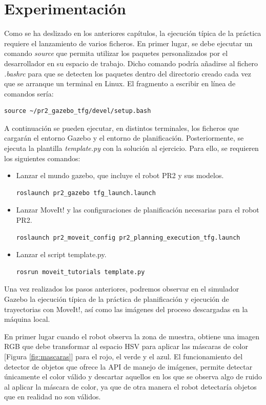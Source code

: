 \documentclass[12pt,spanish,chapterprefix, numbers=noenddot]{book}
\numberwithin{equation}{section}
\numberwithin{figure}{section}
\begin{document}
\section{Experimentación}
Como se ha deslizado en los anteriores capítulos, la ejecución típica \cite{tfg_video_1} \cite{tfg_video_2} de la práctica requiere el lanzamiento de varios ficheros. En primer lugar, se debe ejecutar un comando \textit{source} que permita utilizar los paquetes personalizados por el desarrollador en su espacio de trabajo. Dicho comando podría añadirse al fichero \textit{.bashrc} para que se detecten los paquetes dentro del directorio creado cada vez que se arranque un terminal en Linux. El fragmento a escribir en línea de comandos sería: 
	\begin{lstlisting}[frame=single]
source ~/pr2_gazebo_tfg/devel/setup.bash
    \end{lstlisting}
    
A continuación se pueden ejecutar, en distintos terminales, los ficheros que cargarán el entorno Gazebo y el entorno de planificación. Posteriormente, se ejecuta la plantilla \textit{template.py} con la solución al ejercicio. Para ello, se requieren los siguientes comandos: 
\begin{itemize}
    \item Lanzar el mundo gazebo, que incluye el robot PR2 y sus modelos.
	\begin{lstlisting}[frame=single]
roslaunch pr2_gazebo tfg_launch.launch
    \end{lstlisting}
    \item Lanzar MoveIt! y las configuraciones de planificación necesarias para el robot PR2.
	\begin{lstlisting}[frame=single]
roslaunch pr2_moveit_config pr2_planning_execution_tfg.launch
    \end{lstlisting}
    \item Lanzar el script template.py.
	\begin{lstlisting}[frame=single]
rosrun moveit_tutorials template.py
    \end{lstlisting}
\end{itemize}
Una vez realizados los pasos anteriores, podremos observar en el simulador Gazebo la ejecución típica de la práctica de planificación y ejecución de trayectorias con MoveIt!, así como las imágenes del proceso descargadas en la máquina local. 

En primer lugar cuando el robot observa la zona de muestra, obtiene una imagen RGB que debe transformar al espacio HSV para aplicar las máscaras de color [Figura \ref{fig:mascaras}] para el rojo, el verde y el azul. El funcionamiento del detector de objetos que ofrece la API de manejo de imágenes, permite detectar únicamente el color válido y descartar aquellos en los que se observa algo de ruido al aplicar la máscara de color, ya que de otra manera el robot detectaría objetos que en realidad no son válidos. 
\end{document}
